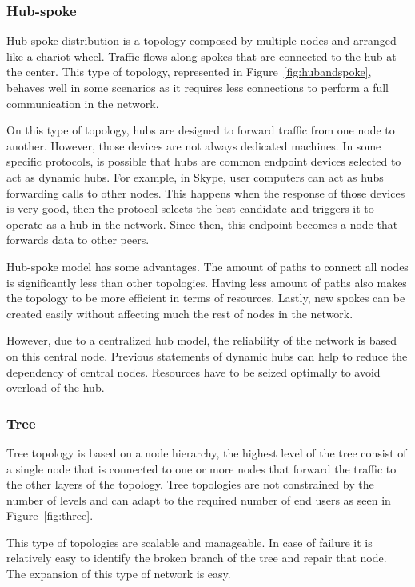 \subsubsection{Hub-spoke}

Hub-spoke distribution is a topology composed by multiple nodes and arranged like a chariot wheel. Traffic flows along spokes that are connected to the hub at the center. This type of topology, represented in Figure~\ref{fig:hubandspoke}, behaves well in some scenarios as it requires less connections to perform a full communication in the network. 

On this type of topology, hubs are designed to forward traffic from one node to another. However, those devices are not always dedicated machines. In some specific protocols, is possible that hubs are common endpoint devices selected to act as dynamic hubs. For example, in Skype, user computers can act as hubs forwarding calls to other nodes. This happens when the response of those devices is very good, then the protocol selects the best candidate and triggers it to operate as a hub in the network. Since then, this endpoint becomes a node that forwards data to other peers. 

Hub-spoke model has some advantages. The amount of paths to connect all nodes is significantly less than other topologies. Having less amount of paths also makes the topology to be more efficient in terms of resources. Lastly, new spokes can be created easily without affecting much the rest of nodes in the network.

However, due to a centralized hub model, the reliability of the network is based on this central node. Previous statements of dynamic hubs can help to reduce the dependency of central nodes. Resources have to be seized optimally to avoid overload of the hub.

\subsubsection{Tree}
 
Tree topology is based on a node hierarchy, the highest level of the tree consist of a single node that is connected to one or more nodes that forward the traffic to the other layers of the topology. Tree topologies are not constrained by the number of levels and can adapt to the required number of end users as seen in Figure~\ref{fig:three}.  

This type of topologies are scalable and manageable. In case of failure it is relatively easy to identify the broken branch of the tree and repair that node. The expansion of this type of network is easy.

